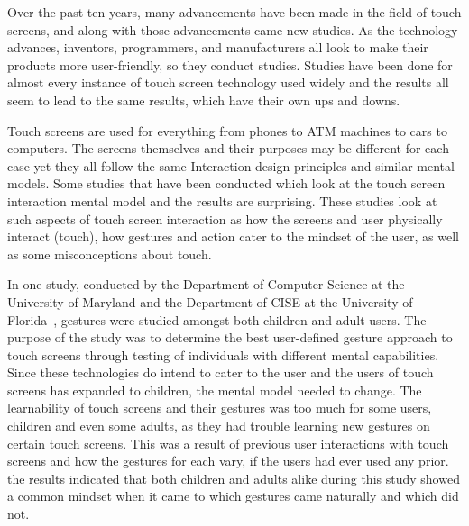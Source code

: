 \documentclass[a4paper]{article}
\begin{document}
     Over the past ten years, many advancements have been made in the field of touch screens, and along with those advancements came new studies. As the technology advances, inventors, programmers, and manufacturers all look to make their products more user-friendly, so they conduct studies. Studies have been done for almost every instance of touch screen technology used widely and the results all seem to lead to the same results, which have their own ups and downs.
     
     Touch screens are used for everything from phones to ATM machines to cars to computers. The screens themselves and their purposes may be different for each case yet they all follow the same Interaction design principles and similar mental models. Some studies that have been conducted which look at the touch screen interaction mental model and the results are surprising. These studies look at such aspects of touch screen interaction as how the screens and user physically interact (touch), how gestures and action cater to the mindset of the user, as well as some misconceptions about touch. 
     
     In one study, conducted by the Department of Computer Science at the University of Maryland and the Department of CISE at the University of Florida~\cite{Gestures}, gestures were studied amongst both children and adult users. The purpose of the study was to determine the best user-defined gesture approach to touch screens through testing of individuals with different mental capabilities. Since these technologies do intend to cater to the user and the users of touch screens has expanded to children, the mental model needed to change. The learnability of touch screens and their gestures was too much for some users, children and even some adults, as they had trouble learning new gestures on certain touch screens. This was a result of previous user interactions with touch screens and how the gestures for each vary, if the users had ever used any prior. the results indicated that both children and adults alike during this study showed a common mindset when it came to which gestures came naturally and which did not. 
     
\end{document}
